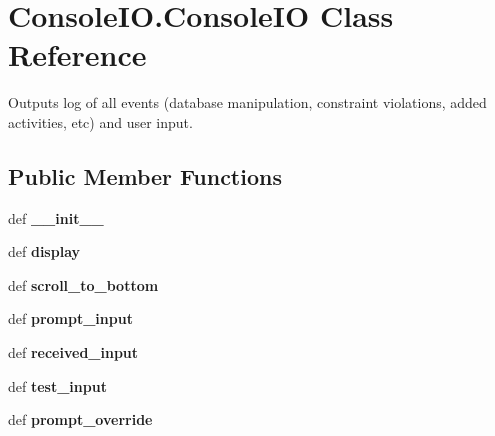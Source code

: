 \hypertarget{classConsoleIO_1_1ConsoleIO}{\section{Console\-I\-O.\-Console\-I\-O Class Reference}
\label{classConsoleIO_1_1ConsoleIO}
}


Outputs log of all events (database manipulation, constraint violations, added activities, etc) and user input.  


\subsection*{Public Member Functions}
\begin{DoxyCompactItemize}
\item 
\hypertarget{classConsoleIO_1_1ConsoleIO_ab6130ba6a6ea2fe9f4e5a7594a626638}{def {\bfseries \-\_\-\-\_\-init\-\_\-\-\_\-}}\label{classConsoleIO_1_1ConsoleIO_ab6130ba6a6ea2fe9f4e5a7594a626638}

\item 
\hypertarget{classConsoleIO_1_1ConsoleIO_a4e4b18df19846e1958a33406fcf983bc}{def {\bfseries display}}\label{classConsoleIO_1_1ConsoleIO_a4e4b18df19846e1958a33406fcf983bc}

\item 
\hypertarget{classConsoleIO_1_1ConsoleIO_aa48c2ade8c7c454f6ad20e78aa58b177}{def {\bfseries scroll\-\_\-to\-\_\-bottom}}\label{classConsoleIO_1_1ConsoleIO_aa48c2ade8c7c454f6ad20e78aa58b177}

\item 
\hypertarget{classConsoleIO_1_1ConsoleIO_a7cb2e29af6c33cd1aa2f22aba0d4d79b}{def {\bfseries prompt\-\_\-input}}\label{classConsoleIO_1_1ConsoleIO_a7cb2e29af6c33cd1aa2f22aba0d4d79b}

\item 
\hypertarget{classConsoleIO_1_1ConsoleIO_a013e864baa19f6ef66857611f2d861ba}{def {\bfseries received\-\_\-input}}\label{classConsoleIO_1_1ConsoleIO_a013e864baa19f6ef66857611f2d861ba}

\item 
\hypertarget{classConsoleIO_1_1ConsoleIO_ad5aa3ad0aa007cd65e58d9f96591893c}{def {\bfseries test\-\_\-input}}\label{classConsoleIO_1_1ConsoleIO_ad5aa3ad0aa007cd65e58d9f96591893c}

\item 
\hypertarget{classConsoleIO_1_1ConsoleIO_a574fc6a8582f7456a3938e2d64084c13}{def {\bfseries prompt\-\_\-override}}\label{classConsoleIO_1_1ConsoleIO_a574fc6a8582f7456a3938e2d64084c13}


\end{DoxyCompactItemize}
